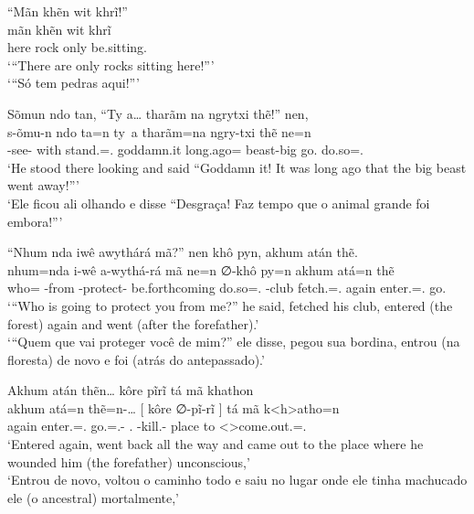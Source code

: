 \documentclass[output=paper,
modfonts,nonflat
]{langsci/langscibook}
\begin{document}
\newpage 
\ea  ``Mãn khẽn wit khrĩ!'' \\[.3em]
\gll mãn  khẽn wit  khrĩ             \\
     here rock only be.sitting.\Pl{} \\
\glt `{}``There are only rocks sitting here!''{}' \\
     `{}``Só tem pedras aqui!''{}' \\
\z

\ea  Sõmun ndo tan, ``Ty a\ldots{} tharãm na ngrytxi thẽ!'' nen, \\[.3em]
\gll s-õmu-n            ndo  ta=n                 ty\ a      tharãm=na         ngry-txi  thẽ      ne=n             \\
     \Third-see-\Nmlz{} with stand.\Sg=\AAnd.\Ss{} goddamn.it long.ago=\N\Fut{} beast-big go.\Sg{} do.so=\AAnd.\Ss{} \\
\glt `He stood there looking and said ``Goddamn it! It was long ago that the big beast went away!''{}' \\
     `Ele ficou ali olhando e disse ``Desgraça! Faz tempo que o animal grande foi embora!''{}' \\
\z

\ea  ``Nhum nda iwê awythárá mã?'' nen khô pyn, akhum atán thẽ. \\[.3em]
\gll nhum=nda   i-wê        a-wythá-rá              mã             ne=n             ∅-khô       py=n                 akhum atá=n                thẽ      \\
     who=\Nom{} \First-from \Second-protect-\Nmlz{} be.forthcoming do.so=\AAnd.\Ss{} \Third-club fetch.\Sg=\AAnd.\Ss{} again enter.\Sg=\AAnd.\Ss{} go.\Sg{} \\
\glt `{}``Who is going to protect you from me?'' he said, fetched his club, entered (the forest) again and went (after the forefather).' \\
     `{}``Quem que vai proteger você de mim?'' ele disse, pegou sua bordina, entrou (na floresta) de novo e foi (atrás do antepassado).' \\
\z

\ea  Akhum atán thẽn\ldots{} kôre pĩrĩ tá mã khathon \\[.3em]
\gll akhum atá=n                thẽ=n-\ldots{}             [  kôre          ∅-pĩ-rĩ                 ]  tá    mã k<h>atho=n                      \\
     again enter.\Sg=\AAnd.\Ss{} go.\Sg=\AAnd.\Ss{}-\Ints{} {} \Third.\Erg{} \Third-kill.\Sg-\Nmlz{} {} place to <\Third>come.out.\Sg=\AAnd.\Ss{} \\
\glt `Entered again, went back all the way and came out to the place where he wounded him (the forefather) unconscious,' \\
     `Entrou de novo, voltou o caminho todo e saiu no lugar onde ele tinha machucado ele (o ancestral) mortalmente,' \\
\z
\end{document}
